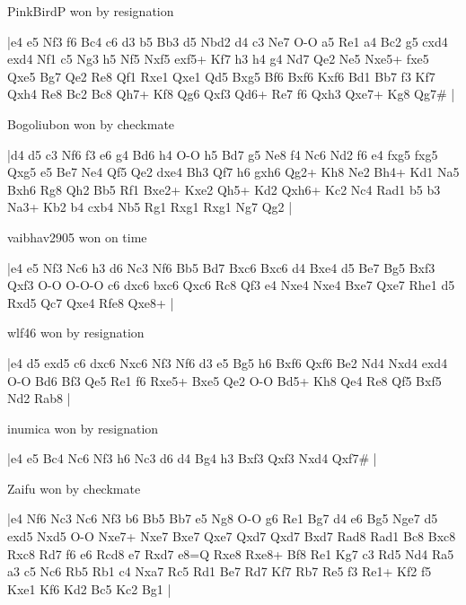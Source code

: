 \showboard

PinkBirdP won by resignation

\makegametitle
|e4 e5 Nf3 f6 Bc4 c6 d3 b5 Bb3 d5 Nbd2 d4 c3 Ne7 O-O a5 Re1 a4 Bc2 g5 cxd4 exd4 Nf1 c5 Ng3 h5 Nf5 Nxf5 exf5+ Kf7 h3 h4 g4 Nd7 Qe2 Ne5 Nxe5+ fxe5 Qxe5 Bg7 Qe2 Re8 Qf1 Rxe1 Qxe1 Qd5 Bxg5 Bf6 Bxf6 Kxf6 Bd1 Bb7 f3 Kf7 Qxh4 Re8 Bc2 Bc8 Qh7+ Kf8 Qg6 Qxf3 Qd6+ Re7 f6 Qxh3 Qxe7+ Kg8 Qg7\#  |

\showboard

Bogoliubon won by checkmate

\makegametitle
|d4 d5 c3 Nf6 f3 e6 g4 Bd6 h4 O-O h5 Bd7 g5 Ne8 f4 Nc6 Nd2 f6 e4 fxg5 fxg5 Qxg5 e5 Be7 Ne4 Qf5 Qe2 dxe4 Bh3 Qf7 h6 gxh6 Qg2+ Kh8 Ne2 Bh4+ Kd1 Na5 Bxh6 Rg8 Qh2 Bb5 Rf1 Bxe2+ Kxe2 Qh5+ Kd2 Qxh6+ Kc2 Nc4 Rad1 b5 b3 Na3+ Kb2 b4 cxb4 Nb5 Rg1 Rxg1 Rxg1 Ng7 Qg2  |

\showboard

vaibhav2905 won on time

\makegametitle
|e4 e5 Nf3 Nc6 h3 d6 Nc3 Nf6 Bb5 Bd7 Bxc6 Bxc6 d4 Bxe4 d5 Be7 Bg5 Bxf3 Qxf3 O-O O-O-O c6 dxc6 bxc6 Qxc6 Rc8 Qf3 e4 Nxe4 Nxe4 Bxe7 Qxe7 Rhe1 d5 Rxd5 Qc7 Qxe4 Rfe8 Qxe8+  |

\showboard

wlf46 won by resignation

\makegametitle
|e4 d5 exd5 c6 dxc6 Nxc6 Nf3 Nf6 d3 e5 Bg5 h6 Bxf6 Qxf6 Be2 Nd4 Nxd4 exd4 O-O Bd6 Bf3 Qe5 Re1 f6 Rxe5+ Bxe5 Qe2 O-O Bd5+ Kh8 Qe4 Re8 Qf5 Bxf5 Nd2 Rab8  |

\showboard

inumica won by resignation

\makegametitle
|e4 e5 Bc4 Nc6 Nf3 h6 Nc3 d6 d4 Bg4 h3 Bxf3 Qxf3 Nxd4 Qxf7\#  |

\showboard

Zaifu won by checkmate

\makegametitle
|e4 Nf6 Nc3 Nc6 Nf3 b6 Bb5 Bb7 e5 Ng8 O-O g6 Re1 Bg7 d4 e6 Bg5 Nge7 d5 exd5 Nxd5 O-O Nxe7+ Nxe7 Bxe7 Qxe7 Qxd7 Qxd7 Bxd7 Rad8 Rad1 Bc8 Bxc8 Rxc8 Rd7 f6 e6 Rcd8 e7 Rxd7 e8=Q Rxe8 Rxe8+ Bf8 Re1 Kg7 c3 Rd5 Nd4 Ra5 a3 c5 Nc6 Rb5 Rb1 c4 Nxa7 Rc5 Rd1 Be7 Rd7 Kf7 Rb7 Re5 f3 Re1+ Kf2 f5 Kxe1 Kf6 Kd2 Bc5 Kc2 Bg1  |

